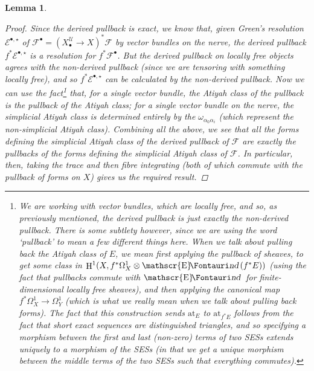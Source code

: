 \documentclass[11pt,fleqn]{article}
\theoremstyle{plain}
\newtheorem{lemma}[theorem]{Lemma}
\theoremstyle{definition}
\theoremstyle{remark}
\numberwithin{equation}{theorem}
\newcommand{\cover}{\mathcal{U}}
\newcommand{\anotherbullet}{\star}
\newcommand{\at}{\mathrm{at}}
\newcommand{\nerve}[1]{X_{#1}^\cover}
\DeclareMathOperator{\HH}{H}
\DeclareMathOperator{\footnotesizesheafend}{\mathscr{E}\textup{\kern -2pt {\Fontauri\slshape nd}}\,}
\begin{document}
\begin{lemma}
\begin{proof}
                Since the derived pullback is exact, we know that, given Green's resolution $\mathcal{E}^{\bullet,\anotherbullet}$ of $\mathscr{F}^\bullet = (\nerve{\bullet}\to X)^*\mathscr{F}$ by vector bundles on the nerve, the derived pullback $f^*\mathcal{E}^{\bullet,\anotherbullet}$ is a resolution for $f^*\mathscr{F}^\bullet$.
                But the derived pullback on locally free objects agrees with the non-derived pullback (since we are tensoring with something locally free), and so $f^*\mathcal{E}^{\bullet,\anotherbullet}$ can be calculated by the non-derived pullback.
                Now we can use the fact\footnote{We are working with vector bundles, which are locally free, and so, as previously mentioned, the derived pullback is just exactly the non-derived pullback. There is some subtlety however, since we are using the word `pullback' to mean a few different things here. When we talk about pulling back the Atiyah class of $E$, we mean first applying the pullback of sheaves, to get some class in $\HH^1(X,f^*\Omega_X^1\otimes\footnotesizesheafend(f^*E))$ (using the fact that pullbacks commute with $\footnotesizesheafend$ for finite-dimensional locally free sheaves), and then applying the canonical map $f^*\Omega_X^1\to\Omega_Y^1$ (which is what we really mean when we talk about pulling back forms). The fact that this construction sends $\at_E$ to $\at_{f^*E}$ follows from the fact that short exact sequences are distinguished triangles, and so specifying a morphism between the first and last (non-zero) terms of two SESs extends uniquely to a morphism of the SESs (in that we get a unique morphism between the middle terms of the two SESs such that everything commutes).} that, for a single vector bundle, the Atiyah class of the pullback is the pullback of the Atiyah class; for a single vector bundle on the nerve, the simplicial Atiyah class is determined entirely by the $\omega_{\alpha_0\alpha_i}$ (which represent the non-simplicial Atiyah class).
                Combining all the above, we see that all the forms defining the simplicial Atiyah class of the derived pullback of $\mathscr{F}$ are exactly the pullbacks of the forms defining the simplicial Atiyah class of $\mathscr{F}$.
                In particular, then, taking the trace and then fibre integrating (both of which commute with the pullback of forms on $X$) gives us the required result.
            \end{proof}
        \end{lemma}
\end{document}
